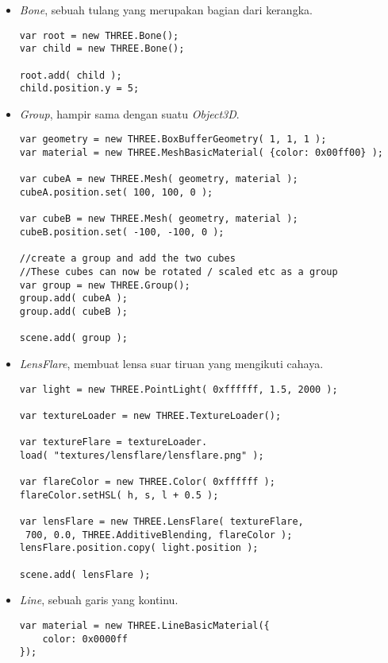 \begin{itemize}
	\begin{itemize}
	\item {\it Bone}, sebuah tulang yang merupakan bagian dari kerangka.
	
\begin{lstlisting}
var root = new THREE.Bone();
var child = new THREE.Bone();

root.add( child );
child.position.y = 5;
\end{lstlisting}
	
	\item {\it Group}, hampir sama dengan suatu {\it Object3D}.
	
\begin{lstlisting}
var geometry = new THREE.BoxBufferGeometry( 1, 1, 1 );
var material = new THREE.MeshBasicMaterial( {color: 0x00ff00} );

var cubeA = new THREE.Mesh( geometry, material );
cubeA.position.set( 100, 100, 0 );

var cubeB = new THREE.Mesh( geometry, material );
cubeB.position.set( -100, -100, 0 );

//create a group and add the two cubes
//These cubes can now be rotated / scaled etc as a group
var group = new THREE.Group();
group.add( cubeA );
group.add( cubeB );

scene.add( group );
\end{lstlisting}
	
	\item {\it LensFlare}, membuat lensa suar tiruan yang mengikuti cahaya.
	
\begin{lstlisting}
var light = new THREE.PointLight( 0xffffff, 1.5, 2000 );

var textureLoader = new THREE.TextureLoader();

var textureFlare = textureLoader.
load( "textures/lensflare/lensflare.png" );

var flareColor = new THREE.Color( 0xffffff );
flareColor.setHSL( h, s, l + 0.5 );

var lensFlare = new THREE.LensFlare( textureFlare,
 700, 0.0, THREE.AdditiveBlending, flareColor );
lensFlare.position.copy( light.position );

scene.add( lensFlare );
\end{lstlisting}
	
	\item {\it Line}, sebuah garis yang kontinu.
	
\begin{lstlisting}
var material = new THREE.LineBasicMaterial({
	color: 0x0000ff
});


\end{lstlisting}
\end{itemize}
\end{itemize}
